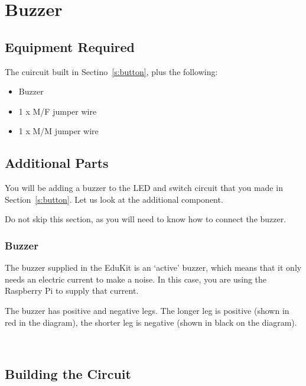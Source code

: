 \section{Buzzer}\label{s:buzzer}


\subsection*{Equipment Required}

The cuircuit built in Sectino~\ref{s:button}, plus the following:
\begin{itemize}
\item Buzzer
\item 1 x M/F jumper wire
\item 1 x M/M jumper wire
\end{itemize}

\subsection*{Additional Parts}

You will be adding a buzzer to the LED and switch circuit that you made in Section~\ref{s:button}.  Let us look at the additional component.

Do not skip this section, as you will need to know how to connect the buzzer.

\subsubsection*{Buzzer}


The buzzer supplied in the EduKit is an `active' buzzer, which means that it only needs an electric current to make a noise.  In this case, you are using the Raspberry Pi to supply that current.

The buzzer has positive and negative legs.  The longer leg is positive (shown in red in the diagram), the shorter leg is negative (shown in black on the diagram).

~\hfill
\vspace{5ex}
~\hfill
\newpage

\subsection*{Building the Circuit}

